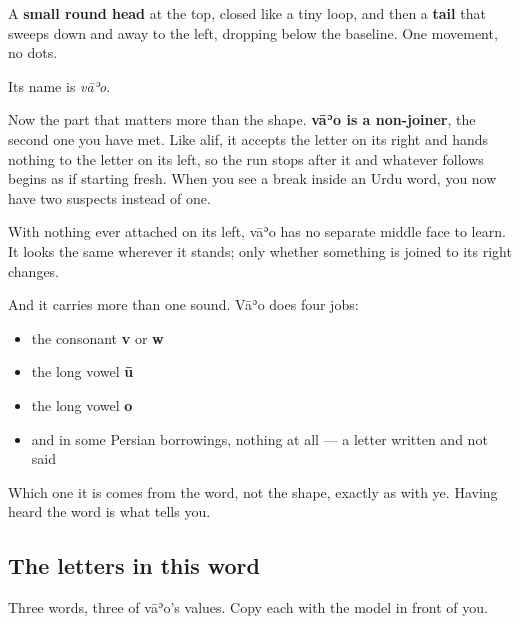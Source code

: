 \begin{quote}
\end{quote}

A \textbf{small round head} at the top, closed like a tiny loop, and then a \textbf{tail} that sweeps down and away to the left, dropping below the baseline. One movement, no dots.

Its name is \textbf{} \emph{vāʾo}.

Now the part that matters more than the shape. \textbf{vāʾo is a non-joiner}, the second one you have met. Like alif, it accepts the letter on its right and hands nothing to the letter on its left, so the run stops after it and whatever follows begins as if starting fresh. When you see a break inside an Urdu word, you now have two suspects instead of one.

With nothing ever attached on its left, vāʾo has no separate middle face to learn. It looks the same wherever it stands; only whether something is joined to its right changes.

And it carries more than one sound. Vāʾo does four jobs:

\begin{itemize}
\raggedright
  \item the consonant \textbf{v} or \textbf{w}
  \item the long vowel \textbf{ū}
  \item the long vowel \textbf{o}
  \item and in some Persian borrowings, nothing at all — a letter written and not said
\end{itemize}

Which one it is comes from the word, not the shape, exactly as with ye. Having heard the word is what tells you.

\subsection*{The letters in this word}
Three words, three of vāʾo's values. Copy each with the model in front of you.

\begin{quote}
\end{quote}

\begin{quote}
\end{quote}

\begin{quote}
\end{quote}

